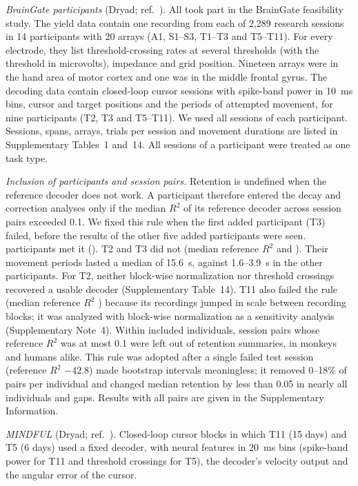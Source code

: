 \documentclass[pdflatex,sn-nature]{sn-jnl}
\begin{document}
\textit{BrainGate participants} (Dryad\cite{data_braingate}; ref.~\cite{hahn2026}). All took part in the BrainGate
feasibility study\cite{rubin2023}. The yield data contain one recording
from each of 2,289 research sessions in 14 participants with 20 arrays (A1, S1--S3, T1--T3 and T5--T11). For every
electrode, they list threshold-crossing rates at several thresholds (with the threshold in microvolts), impedance and
grid position. Nineteen arrays were in the hand area of motor cortex and one was in the middle frontal gyrus. The
decoding data contain closed-loop cursor sessions with spike-band power in 10~ms bins, cursor and target positions and
the periods of attempted movement, for nine participants (T2, T3 and T5--T11). We used all sessions of each
participant. Sessions, spans, arrays, trials per session and movement durations are listed in Supplementary Tables~1
and~14.
All sessions of a participant were treated as one task type.

\textit{Inclusion of participants and session pairs.} Retention is undefined when the reference decoder does not work.
A participant therefore entered the decay and correction analyses only if the median $R^2$ of its reference decoder
across session pairs exceeded 0.1. We fixed this rule when the first added participant (T3) failed, before the results
of the other five added participants were seen.  participants met it (). T2 and T3
did not (median reference $R^2$  and ). Their movement periods lasted a median of 15.6~s,
against 1.6--3.9~s in the other participants. For T2, neither block-wise normalization nor threshold crossings
recovered a usable decoder (Supplementary Table~14). T11 also failed the rule (median reference $R^2$ ) because its
recordings jumped in scale between recording blocks; it was analyzed with block-wise normalization as a sensitivity
analysis (Supplementary Note~4). Within included individuals, session pairs whose reference $R^2$ was at most 0.1
were left out of retention summaries, in monkeys and humans alike. This rule was adopted after a single failed test
session (reference $R^2$ $-42.8$) made bootstrap intervals meaningless; it removed 0--18\% of pairs per individual and
changed median retention by less than 0.05 in nearly all individuals and gaps. Results with all pairs are given in the
Supplementary Information.

\textit{MINDFUL} (Dryad\cite{data_mindful}; ref.~\cite{pun2024}). Closed-loop cursor blocks in which T11 (15 days) and T5
(6 days) used a fixed decoder, with neural features in 20~ms bins (spike-band power for T11 and threshold crossings for
T5), the decoder's velocity output and the angular error of the cursor.
\end{document}

